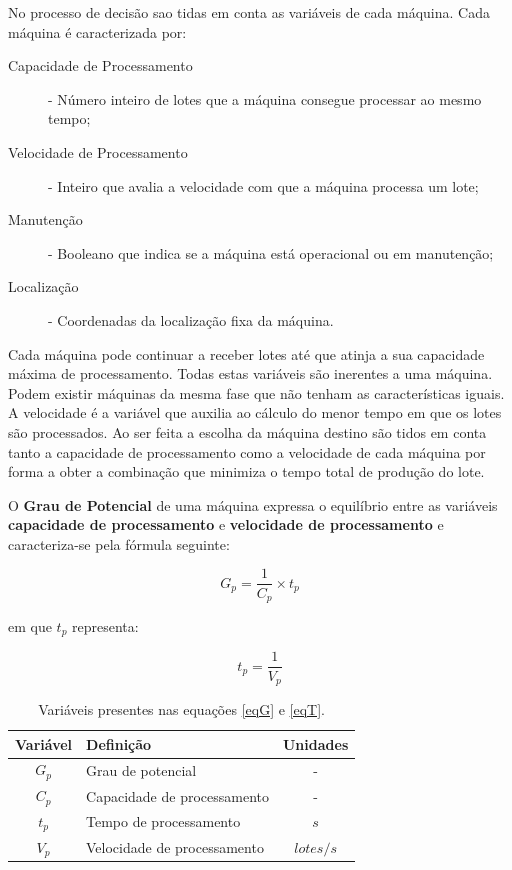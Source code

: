 \begin{titlepage}
No processo de decisão sao tidas em conta as variáveis de cada máquina. Cada máquina é caracterizada por:

\begin{description}
\item[Capacidade de Processamento] -  Número inteiro de lotes que a máquina consegue processar ao mesmo tempo;
\item[Velocidade de Processamento] - Inteiro que avalia a velocidade com que a máquina processa um lote;
\item[Manutenção] - Booleano que indica se a máquina está operacional ou em manutenção;
\item[Localização] - Coordenadas da localização fixa da máquina.
\end{description}

Cada máquina pode continuar a receber lotes até que atinja a sua capacidade máxima de processamento. Todas estas variáveis são inerentes a uma máquina. Podem existir máquinas da mesma fase que não tenham as características iguais. A velocidade é a variável que auxilia ao cálculo do menor tempo em que os lotes são processados. Ao ser feita a escolha da máquina destino são tidos em conta tanto a capacidade de processamento como a velocidade de cada máquina por forma a obter a combinação que minimiza o tempo total de produção do lote.


O \textbf{Grau de Potencial} de uma máquina expressa o equilíbrio entre as variáveis \textbf{capacidade de processamento} e \textbf{velocidade de processamento} e caracteriza-se pela fórmula seguinte:

\begin{equation}
G_{p}=\frac{1}{C_{p}}\times t_{p}
\label{eqG}
\end{equation}

em que $t_{p}$ representa: 

\begin{equation}
t_{p}=\frac{1}{V_{p}}
\label{eqT}
\end{equation}

\begin{table}[H]
\centering
\caption{Variáveis presentes nas equações \ref{eqG} e \ref{eqT}.}
\label{my-label}
\begin{tabular}{@{}p{2cm}ll@{}}
\toprule
\multicolumn{1}{c}{\textbf{Variável}} & \textbf{Definição}   & \multicolumn{1}{c}{\textbf{Unidades}} \\ \midrule
\multicolumn{1}{c}{$G_{p}$} & Grau de potencial &  \multicolumn{1}{c}{-}  \\ \midrule
\multicolumn{1}{c}{$C_{p}$} & Capacidade de processamento &  \multicolumn{1}{c}{-}  \\ \midrule
\multicolumn{1}{c}{$t_{p}$} & Tempo de processamento      & \multicolumn{1}{c}{$s$} \\ \midrule
\multicolumn{1}{c}{$V_{p}$} & Velocidade de processamento  & \multicolumn{1}{c}{$lotes/s$} \\ \bottomrule
\end{tabular}
\end{table}


\end{titlepage}
